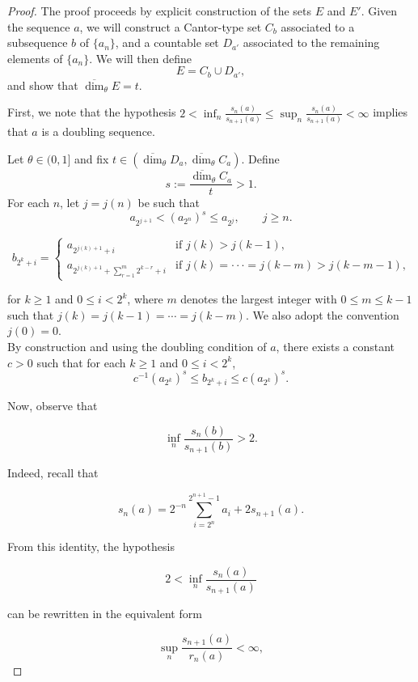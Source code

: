 \documentclass[10pt,a4paper]{amsart}
\begin{document}
\begin{proof}
The proof proceeds by explicit construction of the sets $E$ and $E'$. Given the sequence \(a\), we will construct a Cantor-type set \(C_b\) associated to a subsequence \(b\) of \(\{a_n\}\), and a countable set \(D_{a'}\) associated to the remaining elements of \(\{a_n\}\). We will then define
\[
E = C_b \cup D_{a'},
\]
and show that \( \overline{\dim}_\theta E = t\).

First, we note that the hypothesis $2<\inf_n\frac{s_n(a)}{s_{n+1}(a)}\leq \sup_n\frac{s_n(a)}{s_{n+1}(a)}<\infty $ implies that $a$ is a doubling sequence.

Let \( \theta \in (0,1] \) and fix \( t \in ( \overline{\dim}_\theta D_a , \overline{\dim}_\theta C_a) \). Define
\[
s := \frac{\overline{\dim}_\theta C_a}{t} > 1.
\]
For each \(n\), let \(j=j(n)\) be such that
\begin{equation}\label{j(n)}
    a_{2^{j+1}} < (a_{2^n})^s \leq a_{2^j}, \qquad j \geq n.
\end{equation}


\[ b_{2^k+i} = \begin{cases}                  a_{2^{j(k)+1}+i} & \text{if $j(k)>j(k-1)$,}\\                  a_{2^{j(k)+1}+\sum_{r=1}^m 2^{k-r}+i} &    \text{if $j(k)=\cdot\cdot\cdot=j(k-m)>j(k-m-1)$,}           \end{cases} \]

for \(k\ge 1\) and \(0\le i<2^k\), where \(m\) denotes the largest integer with \(0\le m\le k-1\) such that \(j(k)=j(k-1)=\cdots=j(k-m)\). 
We also adopt the convention \(j(0)=0\).\\
By construction and using the doubling condition of $a$, there exists a constant $c>0$ such that for each \(k \geq 1\) and \(0 \leq i < 2^k\),
\[
c^{-1} (a_{2^k})^s \leq b_{2^k+i} \leq c (a_{2^k})^s.
\]


Now, observe that

$$
\inf_n \frac{s_n(b)}{s_{n+1}(b)} > 2.
$$

Indeed, recall that

$$
s_n(a) = 2^{-n} \sum_{i=2^n}^{2^{n+1}-1} a_i + 2 s_{n+1}(a).
$$

From this identity, the hypothesis

$$
2 < \inf_n \frac{s_n(a)}{s_{n+1}(a)}
$$

can be rewritten in the equivalent form

$$
\sup_n \frac{s_{n+1}(a)}{r_n(a)} < \infty,
$$


\end{proof}
\end{document}
